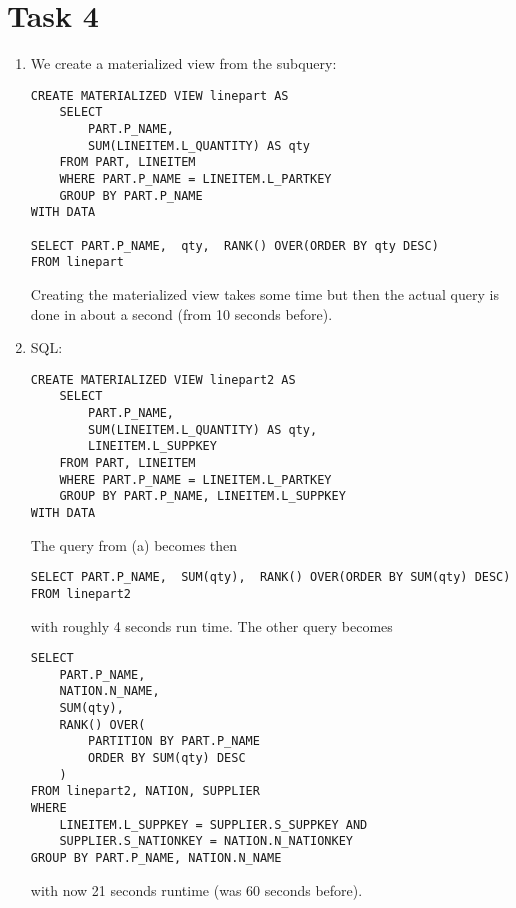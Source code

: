 \documentclass{article}
\begin{document}
	\section*{Task 4}
	\begin{enumerate}[label=(\alph*)]
		\item We create a materialized view from the subquery:
		\begin{lstlisting}[tabsize=2]
CREATE MATERIALIZED VIEW linepart AS
	SELECT 
		PART.P_NAME,
		SUM(LINEITEM.L_QUANTITY) AS qty
	FROM PART, LINEITEM
	WHERE PART.P_NAME = LINEITEM.L_PARTKEY
	GROUP BY PART.P_NAME
WITH DATA

SELECT PART.P_NAME,  qty,  RANK() OVER(ORDER BY qty DESC)
FROM linepart
		\end{lstlisting}
		Creating the materialized view takes some time but then the actual query is done in about a second (from 10 seconds before).
		\item SQL:
		\begin{lstlisting}[tabsize=2]
CREATE MATERIALIZED VIEW linepart2 AS
	SELECT 
		PART.P_NAME,
		SUM(LINEITEM.L_QUANTITY) AS qty,
		LINEITEM.L_SUPPKEY
	FROM PART, LINEITEM
	WHERE PART.P_NAME = LINEITEM.L_PARTKEY
	GROUP BY PART.P_NAME, LINEITEM.L_SUPPKEY
WITH DATA
		\end{lstlisting}
		The query from (a) becomes then
		\begin{lstlisting}[tabsize=2]
SELECT PART.P_NAME,  SUM(qty),  RANK() OVER(ORDER BY SUM(qty) DESC)
FROM linepart2
		\end{lstlisting}
		with roughly 4 seconds run time. The other query becomes
		\begin{lstlisting}[tabsize=2]
SELECT
	PART.P_NAME,
	NATION.N_NAME,
	SUM(qty),
	RANK() OVER(
		PARTITION BY PART.P_NAME 
		ORDER BY SUM(qty) DESC
	)
FROM linepart2, NATION, SUPPLIER
WHERE
	LINEITEM.L_SUPPKEY = SUPPLIER.S_SUPPKEY AND
	SUPPLIER.S_NATIONKEY = NATION.N_NATIONKEY
GROUP BY PART.P_NAME, NATION.N_NAME
		\end{lstlisting}
		with now 21 seconds runtime (was 60 seconds before).
	\end{enumerate}
\end{document}
